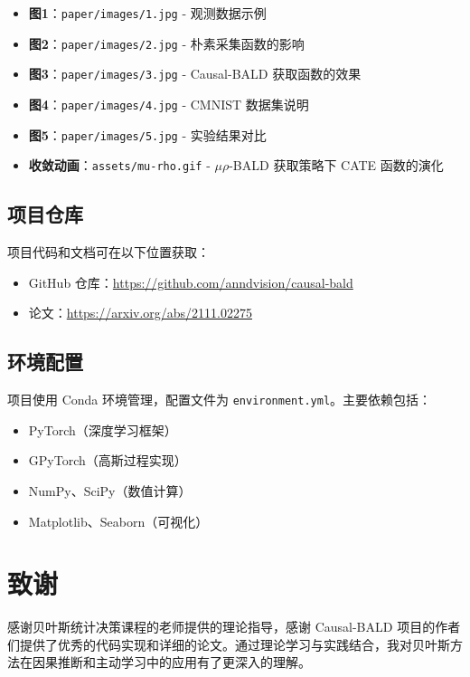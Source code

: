 \documentclass[12pt]{article}
\begin{document}
\begin{itemize}
\item \textbf{图1}：\texttt{paper/images/1.jpg} - 观测数据示例
\item \textbf{图2}：\texttt{paper/images/2.jpg} - 朴素采集函数的影响
\item \textbf{图3}：\texttt{paper/images/3.jpg} - Causal-BALD 获取函数的效果
\item \textbf{图4}：\texttt{paper/images/4.jpg} - CMNIST 数据集说明
\item \textbf{图5}：\texttt{paper/images/5.jpg} - 实验结果对比
\item \textbf{收敛动画}：\texttt{assets/mu-rho.gif} - $\mu\rho$-BALD 获取策略下 CATE 函数的演化
\end{itemize}

\subsection{项目仓库}

项目代码和文档可在以下位置获取：
\begin{itemize}
\item GitHub 仓库：\url{https://github.com/anndvision/causal-bald}
\item 论文：\url{https://arxiv.org/abs/2111.02275}
\end{itemize}

\subsection{环境配置}

项目使用 Conda 环境管理，配置文件为 \texttt{environment.yml}。主要依赖包括：
\begin{itemize}
\item PyTorch（深度学习框架）
\item GPyTorch（高斯过程实现）
\item NumPy、SciPy（数值计算）
\item Matplotlib、Seaborn（可视化）
\end{itemize}

\section*{致谢}

感谢贝叶斯统计决策课程的老师提供的理论指导，感谢 Causal-BALD 项目的作者们提供了优秀的代码实现和详细的论文。通过理论学习与实践结合，我对贝叶斯方法在因果推断和主动学习中的应用有了更深入的理解。
\end{document}
